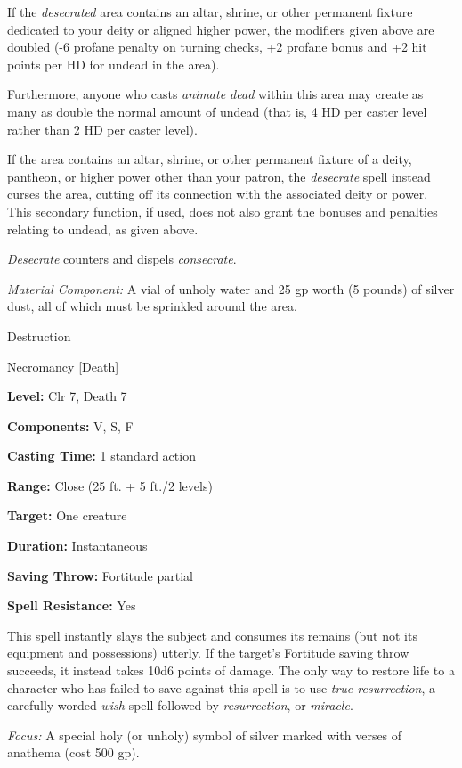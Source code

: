\documentclass{article}
\begin{document}
If the \textit{desecrated }area contains an altar, shrine, or other permanent fixture 
dedicated to your deity or aligned higher power, the modifiers given above are 
doubled (-6 profane penalty on turning checks, +2 profane bonus and +2 hit points 
per HD for undead in the area).

Furthermore, anyone who casts \textit{animate dead }within this area may create 
as many as double the normal amount of undead (that is, 4 HD per caster level rather 
than 2 HD per caster level).

If the area contains an altar, shrine, or other permanent fixture of a deity, pantheon, 
or higher power other than your patron, the \textit{desecrate }spell instead curses 
the area, cutting off its connection with the associated deity or power. This secondary 
function, if used, does not also grant the bonuses and penalties relating to undead, 
as given above.

\textit{Desecrate }counters and dispels \textit{consecrate}.

\textit{Material Component: }A vial of unholy water and 25 gp worth (5 pounds) 
of silver dust, all of which must be sprinkled around the area.

\vspace{12pt}
Destruction

Necromancy [Death]

\textbf{Level:} Clr 7, Death 7

\textbf{Components:} V, S, F

\textbf{Casting Time:} 1 standard action

\textbf{Range:} Close (25 ft. + 5 ft./2 levels)

\textbf{Target:} One creature

\textbf{Duration:} Instantaneous

\textbf{Saving Throw:} Fortitude partial

\textbf{Spell Resistance:} Yes

This spell instantly slays the subject and consumes its remains (but not its equipment 
and possessions) utterly. If the target's Fortitude saving throw succeeds, it instead 
takes 10d6 points of damage. The only way to restore life to a character who has 
failed to save against this spell is to use \textit{true resurrection}, a carefully 
worded \textit{wish }spell followed by \textit{resurrection}, or \textit{miracle}.

\textit{Focus: }A special holy (or unholy) symbol of silver marked with verses 
of anathema (cost 500 gp).
\end{document}
